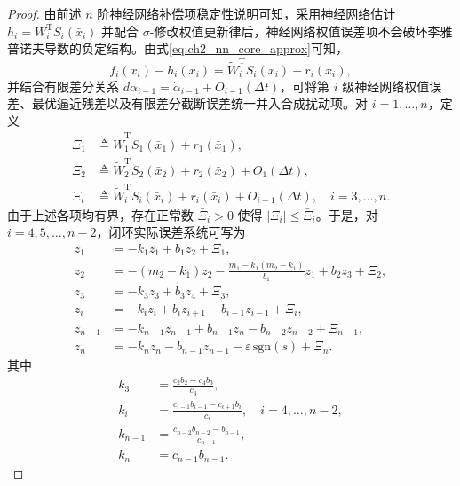 \begin{proof}
由前述 $n$ 阶神经网络补偿项稳定性说明可知，采用神经网络估计 $h_i=W_i^{\mathrm T}S_i(\bar x_i)$ 并配合 $\sigma$-修改权值更新律后，神经网络权值误差项不会破坏李雅普诺夫导数的负定结构。由式\eqref{eq:ch2_nn_core_approx}可知，
\begin{equation}\label{eq:ch3_f_minus_h}
  f_i(\bar x_i)-h_i(\bar x_i)=\tilde W_i^{\mathrm T}S_i(\bar x_i)+r_i(\bar x_i),
\end{equation}
并结合有限差分关系 $d\alpha_{i-1}=\dot\alpha_{i-1}+O_{i-1}(\Delta t)$，可将第 $i$ 级神经网络权值误差、最优逼近残差以及有限差分截断误差统一并入合成扰动项。对 $i=1,\ldots,n$，定义
\begin{subequations}\label{eq:ch3_Xi_def}
\begin{align}
  \Xi_1&\triangleq \tilde W_1^{\mathrm T}S_1(\bar x_1)+r_1(\bar x_1),\\
  \Xi_2&\triangleq \tilde W_2^{\mathrm T}S_2(\bar x_2)+r_2(\bar x_2)+O_1(\Delta t),\\
  \Xi_i&\triangleq \tilde W_i^{\mathrm T}S_i(\bar x_i)+r_i(\bar x_i)+O_{i-1}(\Delta t),\quad i=3,\ldots,n.
\end{align}
\end{subequations}
由于上述各项均有界，存在正常数 $\bar\Xi_i>0$ 使得 $|\Xi_i|\le \bar\Xi_i$。于是，对 $i=4,5,\ldots,n-2$，闭环实际误差系统可写为
\begin{subequations}\label{eq:ch3_zdot_mid}
\begin{align}
\dot z_1&=-k_1z_1+b_1z_2+\Xi_1,\label{eq:ch3_zdot_mid1}\\
\dot z_2&=-(m_2-k_1)z_2-\frac{m_1-k_1(m_2-k_1)}{b_1}z_1+b_2z_3+\Xi_2,\label{eq:ch3_zdot_mid2}\\
\dot z_3&=-k_3 z_3+b_3z_4+\Xi_3,\label{eq:ch3_zdot_mid3}\\
\dot z_i&=-k_i z_i+b_iz_{i+1}-b_{i-1}z_{i-1}+\Xi_i,\label{eq:ch3_zdot_mid4}\\
\dot z_{n-1}&=-k_{n-1}z_{n-1}+b_{n-1}z_n-b_{n-2}z_{n-2}+\Xi_{n-1},\label{eq:ch3_zdot_mid5}\\
\dot z_n&=-k_n z_n-b_{n-1}z_{n-1}-\varepsilon\,\mathrm{sgn}(s)+\Xi_n.\label{eq:ch3_zdot_mid6}
\end{align}
\end{subequations}
其中
\begin{subequations}
\begin{align}
k_3&=\frac{c_2b_2-c_4b_3}{c_3},\\
k_i&=\frac{c_{i-1}b_{i-1}-c_{i+1}b_i}{c_i},\quad i=4,\ldots,n-2,\\
k_{n-1}&=\frac{c_{n-2}b_{n-2}-b_{n-1}}{c_{n-1}},\\
k_n&=c_{n-1}b_{n-1}.
\end{align}
\end{subequations}


\end{proof}
